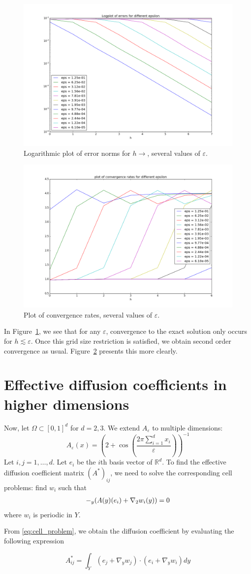\documentclass{article}
\renewcommand{\epsilon}{\varepsilon}
\newcommand{\R}{\mathbb{ R}}
\let\div\relax
\DeclareMathOperator{\div}{div}
\begin{document}
\begin{figure}[ht]
    \centering
    \includegraphics[width=0.5\linewidth]{one_dim_h_eps1.png}
    \caption{Logarithmic plot of error norms for $h\to$, several values of $\epsilon$.}
    \label{fig:one_dim_h_eps1}
\end{figure}

\begin{figure}[ht]
    \centering
    \includegraphics[width=0.5\linewidth]{one_dim_h_eps2.png}
    \caption{Plot of convergence rates, several values of $\epsilon$.}
    \label{fig:one_dim_h_eps2}
\end{figure}

In Figure~\ref{fig:one_dim_h_eps1}, we see that for any $\epsilon$, convergence to the exact solution only occurs for $h \lesssim \epsilon$. Once this grid size restriction is satisfied, we obtain second order convergence as usual. Figure~\ref{fig:one_dim_h_eps2} presents this more clearly.

\section{Effective diffusion coefficients in higher dimensions}
Now, let $\Omega \subset [0,1]^d$ for $d=2,3$. We extend $A_\epsilon$ to multiple dimensions:
\begin{equation}
    A_\epsilon(x) =  \left( 2+\cos\left(\frac{2\pi \sum_{i=1}^dx_i}{\epsilon}\right) \right)^{-1}
\end{equation}
Let $i,j=1,\dots,d$. Let $e_i$ be the $i$th basis vector of $\R^d$. To find the effective diffusion coefficient matrix $(A^*)_{ij}$, we need to solve the corresponding cell problems: find $w_i$ such that
\begin{equation}
    \begin{split}
        -\div_y(A(y)(e_i) + \nabla_2w_i(y)) = 0
    \end{split}
    \label{eq:cell_problem}
\end{equation}
where $w_i$ is periodic in $Y$.

From \eqref{eq:cell_problem}, we obtain the diffusion coefficient by evaluating the following expression

\begin{equation}
    A^*_{ij} = \int_Y(e_j + \nabla_y w_j)\cdot(e_i + \nabla_y w_i)dy
\end{equation}
\end{document}
